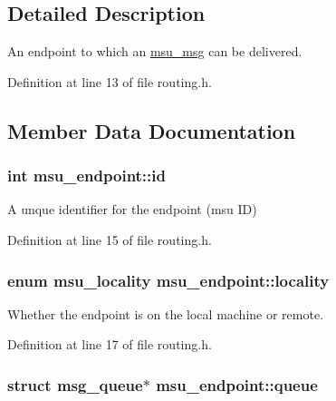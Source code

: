 \subsection{Detailed Description}
An endpoint to which an \hyperlink{structmsu__msg}{msu\-\_\-msg} can be delivered. 

Definition at line 13 of file routing.\-h.



\subsection{Member Data Documentation}
\hypertarget{structmsu__endpoint_ac80e655dbd6368c00945caf7de8e5a4b}{
\subsubsection[{id}]{\setlength{\rightskip}{0pt plus 5cm}int msu\-\_\-endpoint\-::id}}\label{structmsu__endpoint_ac80e655dbd6368c00945caf7de8e5a4b}


A unque identifier for the endpoint (msu I\-D) 



Definition at line 15 of file routing.\-h.

\hypertarget{structmsu__endpoint_aa06a2a0cc4c7ba40109635371acc8249}{
\subsubsection[{locality}]{\setlength{\rightskip}{0pt plus 5cm}enum {\bf msu\-\_\-locality} msu\-\_\-endpoint\-::locality}}\label{structmsu__endpoint_aa06a2a0cc4c7ba40109635371acc8249}


Whether the endpoint is on the local machine or remote. 



Definition at line 17 of file routing.\-h.

\hypertarget{structmsu__endpoint_af1f7b343c89039de19431c0e620916b3}{
\subsubsection[{queue}]{\setlength{\rightskip}{0pt plus 5cm}struct {\bf msg\-\_\-queue}$\ast$ msu\-\_\-endpoint\-::queue}}\label{structmsu__endpoint_af1f7b343c89039de19431c0e620916b3}


